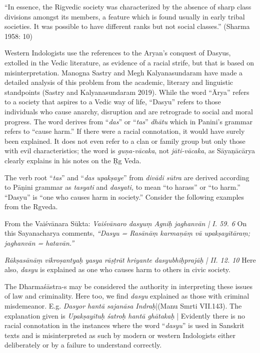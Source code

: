 \begin{myquote}
“In essence, the Rigvedic society was characterized by the absence of sharp class divisions amongst its members, a feature which is found usually in early tribal societies. It was possible to have different ranks but not social classes.” (Sharma 1958: 10)
\end{myquote}

Western Indologists use the references to the Aryan’s conquest of Dasyus, extolled in the Vedic literature, as evidence of a racial strife, but that is based on misinterpretation. Manogna Sastry and Megh Kalyanasundaram have made a detailed analysis of this problem from the academic, literary and linguistic standpoints (Sastry and Kalyanasundaram 2019). While the word “Ārya” refers to a society that aspires to a Vedic way of life, “Dasyu” refers to those individuals who cause anarchy, disruption and are retrograde to social and moral progress. The word derives from “\textit{das}” or “\textit{tas}” \textit{dhātu} which in Panini’s grammar refers to “cause harm.” If there were a racial connotation, it would have surely been explained. It does not even refer to a clan or family group but only those with evil characteristics; the word is \textit{guņa-vācaka}, not \textit{jāti-vācaka}, as Sāyaņācārya clearly explains in his notes on the Ṛg Veda.

The verb root “\textit{tas}” and “\textit{das upakṣaye}” from \textit{divādi sūtra} are derived according to Pāņini grammar as \textit{tasyati} and \textit{dasyati,} to mean “to harass” or “to harm.” “Dasyu” is “one who causes harm in society.” Consider the following examples from the Rgveda.

From the Vaiśvānara Sūkta: \textit{Vaiśvānaro dasyuṃ Agniḥ jaghanvān | I. 59. 6} On this Sayanacharya comments, \textit{“Dasyu = Rasānāṃ karmaņāṃ vā upakṣayitāraṃ; jaghanvān = hatavān.”}

\textit{Rākṣasānāṃ vikroṣantyaḥ yasya rāṣṭrāt hriyante dasyubhiḥprajāḥ | II. 12. 10} Here also, \textit{dasyu} is explained as one who causes harm to others in civic society.

The Dharmaśāstra-s may be considered the authority in interpreting these issues of law and criminality. Here too, we find \textit{dasyu} explained as those with criminal misdemeanor. E.g. \textit{Dasyor hantā sajanāsa Indraḥ}|(Manu Smrti VII.143). The explanation given is \textit{Upakṣayituḥ śatroḥ hantā ghātakaḥ} | Evidently there is no racial connotation in the instances where the word “\textit{dasyu}” is used in Sanskrit texts and is misinterpreted as such by modern or western Indologists either deliberately or by a failure to understand correctly.

